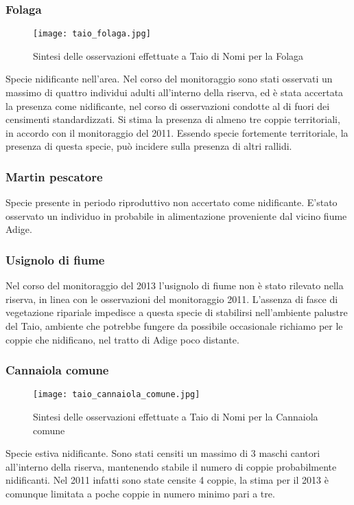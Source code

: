 \documentclass[11pt,a4paper,twoside]{memoir}
\begin{document}
\subsubsection{Folaga}
\vspace*{\fill}
\begin{figure}[H]
  \centering
  \texttt{[image: taio\_folaga.jpg]}
  \caption{Sintesi delle osservazioni effettuate a Taio di Nomi per la Folaga}
\end{figure}\vspace*{\fill}
Specie nidificante nell’area. Nel corso del monitoraggio sono stati osservati un massimo di quattro individui adulti all'interno della riserva, ed è stata accertata la presenza come nidificante, nel corso di osservazioni condotte al di fuori dei censimenti standardizzati. Si stima la presenza di almeno tre coppie territoriali, in accordo con il monitoraggio del 2011. Essendo specie fortemente territoriale, la presenza di questa specie, può incidere sulla presenza di altri rallidi. 

\subsubsection{Martin pescatore}
Specie presente in periodo riproduttivo non accertato come nidificante. E’stato osservato un individuo in probabile in alimentazione proveniente dal vicino fiume Adige.

\subsubsection{Usignolo di fiume}
Nel corso del monitoraggio del 2013 l'usignolo di fiume non è stato rilevato nella riserva, in linea con le osservazioni del monitoraggio 2011. L'assenza di fasce di vegetazione ripariale impedisce a questa specie di stabilirsi nell'ambiente palustre del Taio, ambiente che potrebbe fungere da possibile occasionale richiamo per le coppie che nidificano, nel tratto di Adige poco distante.

\subsubsection{Cannaiola comune}
\vspace*{\fill}
\begin{figure}[H]
  \centering
  \texttt{[image: taio\_cannaiola\_comune.jpg]}
  \caption{Sintesi delle osservazioni effettuate a Taio di Nomi per la Cannaiola comune}
\end{figure}\vspace*{\fill}
Specie estiva nidificante. Sono stati censiti un massimo di 3 maschi cantori all’interno della riserva, mantenendo stabile il numero di coppie probabilmente nidificanti. Nel 2011 infatti sono state censite 4 coppie, la stima per il 2013 è comunque limitata a poche coppie in numero minimo pari a tre.
\end{document}
